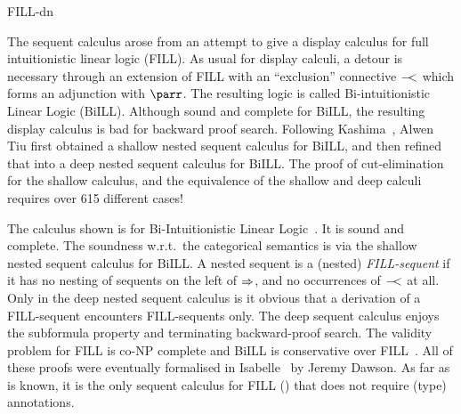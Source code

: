 \begin{entry}{FILL-dn}
\begin{history}
  The sequent calculus arose from an attempt to give a display
  calculus for full intuitionistic linear logic (FILL). As usual for
  display calculi, a detour is necessary through an extension of FILL
  with an ``exclusion'' connective ${-\!\!\!<}$ which forms an adjunction
  with $\parr$. The resulting logic is called Bi-intuitionistic Linear
  Logic (BiILL). Although sound and complete for BiILL, the resulting
  display calculus is bad for backward proof search. Following
  Kashima~\cite{DBLP:journals/sLogica/Kashima94}, Alwen Tiu first
  obtained a shallow nested sequent calculus for BiILL, and then
  refined that into a deep nested sequent calculus for BiILL. The
  proof of cut-elimination for the shallow calculus, and the
  equivalence of the shallow and deep calculi requires over 615
  different cases!
\end{history}

\begin{technicalities}
  The calculus shown is for Bi-Intuitionistic Linear
  Logic~\cite{DBLP:conf/csl/CloustonDGT13}. It is sound and
  complete. The soundness w.r.t.\ the categorical semantics is via
  the shallow nested sequent calculus
  for BiILL. A nested sequent is a (nested) \emph{FILL-sequent} if it
  has no nesting of sequents on the left of $\Rightarrow$, and no occurrences
  of ${-\!\!\!<}$ at all. Only in the deep nested sequent calculus is it
  obvious that a derivation of a FILL-sequent encounters FILL-sequents
  only. The deep sequent calculus enjoys the subformula property and
  terminating backward-proof search. The validity problem for FILL is
  co-NP complete and BiILL is conservative over
  FILL~\cite{DBLP:conf/csl/CloustonDGT13}. All of these proofs were
  eventually formalised in
  Isabelle~\cite{DBLP:conf/ifipTCS/DawsonCGT14} by Jeremy Dawson. As
  far as is known, it is the only sequent calculus for FILL
  () that does not require (type) annotations.
\end{technicalities}




\end{entry}
